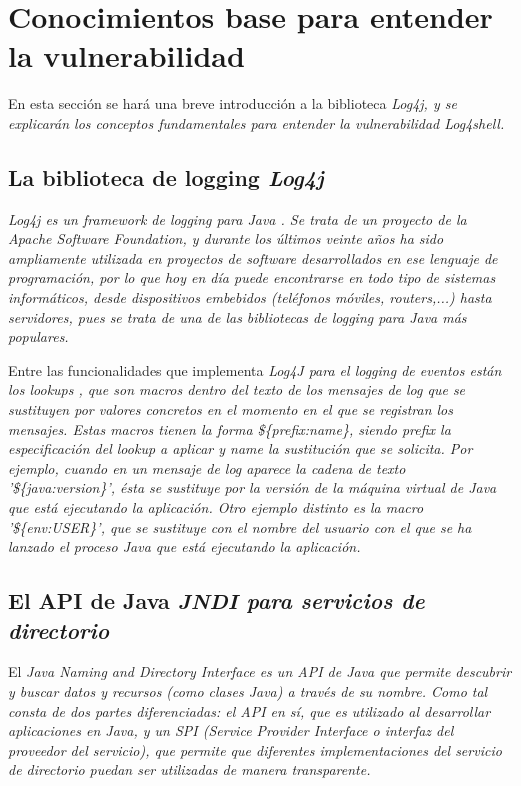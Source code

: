 \documentclass[../main.tex]{subfiles}
\begin{document}
\section{Conocimientos base para entender la vulnerabilidad}

En esta sección se hará una breve introducción a la biblioteca \it{Log4j}, y se explicarán los conceptos fundamentales para entender la vulnerabilidad \it{Log4shell}.

\subsection{La biblioteca de logging \it{Log4j}}

\it{Log4j} es un framework de logging para Java \cite{log4j}. Se trata de un proyecto de la \it{Apache Software Foundation}, y durante los últimos veinte años ha sido ampliamente utilizada en proyectos de software desarrollados en ese lenguaje de programación, por lo que hoy en día puede encontrarse en todo tipo de sistemas informáticos, desde dispositivos embebidos (teléfonos móviles, routers,...) hasta servidores, pues se trata de una de las bibliotecas de logging para Java más populares.

Entre las funcionalidades que implementa \it{Log4J} para el logging de eventos están los \it{lookups} \cite{log4j-lookup}, que son macros dentro del texto de los mensajes de log que se sustituyen por valores concretos en el momento en el que se registran los mensajes. Estas macros tienen la forma \it{\$\{prefix:name\}}, siendo \it{prefix} la especificación del \it{lookup} a aplicar y \it{name} la sustitución que se solicita. Por ejemplo, cuando en un mensaje de log aparece la cadena de texto '\it{\$\{java:version\}}', ésta se sustituye por la versión de la máquina virtual de Java que está ejecutando la aplicación. Otro ejemplo distinto es la macro '\it{\$\{env:USER\}}', que se sustituye con el nombre del usuario con el que se ha lanzado el proceso Java que está ejecutando la aplicación.

\subsection{El API de Java \it{JNDI} para servicios de directorio}

El \it{Java Naming and Directory Interface} es un API de Java que permite descubrir y buscar datos y recursos (como clases Java) a través de su nombre. Como tal consta de dos partes diferenciadas: el API en sí, que es utilizado al desarrollar aplicaciones en Java, y un SPI (\it{Service Provider Interface} o interfaz del proveedor del servicio), que permite que diferentes implementaciones del servicio de directorio puedan ser utilizadas de manera transparente.
\end{document}
